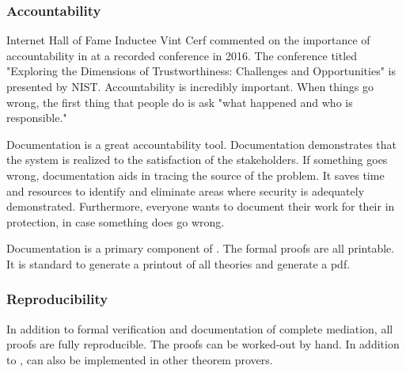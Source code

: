 \documentclass[../../main/main.tex]{subfiles}
\begin{document}
\subsubsection{Accountability}\label{ssec:accountability}
Internet Hall of Fame Inductee Vint Cerf commented on the importance of accountability in  at a recorded conference in 2016.  The conference titled "Exploring the Dimensions of Trustworthiness: Challenges and Opportunities" is presented by NIST.  Accountability is incredibly important.  When things go wrong, the first thing that people do is ask "what happened and who is responsible."


Documentation is a great accountability tool.  Documentation demonstrates that the system is realized to the satisfaction of the stakeholders. If something goes wrong, documentation aids in tracing the source of the problem. It saves time and resources to identify and eliminate areas where security is adequately demonstrated.   Furthermore, everyone wants to document their work for their in protection, in case something does go wrong.  

Documentation is a primary component of .  The  formal proofs are all printable. It is standard to generate a printout of all theories and generate a pdf.  

\subsubsection{Reproducibility}\label{ssec:reproducibility}
In addition to formal verification and documentation of complete mediation, all proofs are fully reproducible.  The  proofs can be worked-out by hand.  In addition to ,  can also be implemented in other theorem provers.
\end{document}
